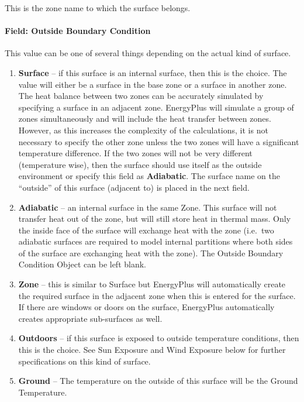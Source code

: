 This is the zone name to which the surface belongs.

\paragraph{Field: Outside Boundary Condition}\label{field-outside-boundary-condition-1}

This value can be one of several things depending on the actual kind of surface.

\begin{enumerate}
  \item
    \textbf{Surface} -- if this surface is an internal surface, then this is the choice. The value will either be a surface in the base zone or a surface in another zone. The heat balance between two zones can be accurately simulated by specifying a surface in an adjacent zone. EnergyPlus will simulate a group of zones simultaneously and will include the heat transfer between zones. However, as this increases the complexity of the calculations, it is not necessary to specify the other zone unless the two zones will have a significant temperature difference. If the two zones will not be very different (temperature wise), then the surface should use itself as the outside environment or specify this field as \textbf{Adiabatic}. The surface name on the ``outside'' of this surface (adjacent to) is placed in the next field.
  \item
    \textbf{Adiabatic} -- an internal surface in the same Zone. This surface will not transfer heat out of the zone, but will still store heat in thermal mass. Only the inside face of the surface will exchange heat with the zone (i.e.~two adiabatic surfaces are required to model internal partitions where both sides of the surface are exchanging heat with the zone). The Outside Boundary Condition Object can be left blank.
  \item
    \textbf{Zone} -- this is similar to Surface but EnergyPlus will automatically create the required surface in the adjacent zone when this is entered for the surface. If there are windows or doors on the surface, EnergyPlus automatically creates appropriate sub-surfaces as well.
  \item
    \textbf{Outdoors} -- if this surface is exposed to outside temperature conditions, then this is the choice. See Sun Exposure and Wind Exposure below for further specifications on this kind of surface.
  \item
    \textbf{Ground} -- The temperature on the outside of this surface will be the Ground Temperature.

\end{enumerate}
